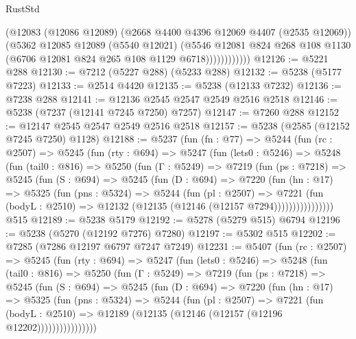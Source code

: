 \begin{lexlean}{RustStd}
\begin{coremodule}
                    (@12083
                      (@12086 @12089)
                      (@2668 @4400 @4396 @12069 @4407 (@2535 @12069))
                      (@5362
                        @12085
                        @12089
                        (@5540 @12021)
                        (@5546
                          @12081
                          @824
                          @268
                          @108
                          @1130
                          (@6706 @12081 @824 @265 @108 @1129 @6718))))))))))))
@12126 := @5221 @288
@12130 := @7212 (@5227 @288) (@5233 @288)
@12132 := @5238 (@5177 @7223)
@12133 := @2514 @4420
@12135 := @5238 (@12133 @7232)
@12136 := @7238 @288
@12141 := @12136 @2545 @2547 @2549 @2516 @2518
@12146 := @5238 (@7237 (@12141 @7245 @7250) @7257)
@12147 := @7260 @288
@12152 := @12147 @2545 @2547 @2549 @2516 @2518
@12157 := @5238 (@2585 (@12152 @7245 @7250) @1128)
@12188 := @5237
    (fun (fn : @77) =>
    @5244
      (fun (rc : @2507) =>
      @5245
        (fun (rty : @694) =>
        @5247
          (fun (lets0 : @5246) =>
          @5248
            (fun (tail0 : @816) =>
            @5250
              (fun (Γ : @5249) =>
              @7219
                (fun (ps : @7218) =>
                @5245
                  (fun (S : @694) =>
                  @5245
                    (fun (D : @694) =>
                    @7220
                      (fun (hn : @17) =>
                      @5325
                        (fun (pns : @5324) =>
                        @5244
                          (fun (pl : @2507) =>
                          @7221
                            (fun (bodyL : @2510) =>
                            @12132 (@12135 (@12146 (@12157 @7294))))))))))))))))
    @515
@12189 := @5238 @5179
@12192 := @5278 (@5279 @515) @6794
@12196 := @5238 (@5270 (@12192 @7276) @7280)
@12197 := @5302 @515
@12202 := @7285 (@7286 @12197 @6797 @7247 @7249)
@12231 := @5407
    (fun (rc : @2507) =>
    @5245
      (fun (rty : @694) =>
      @5247
        (fun (lets0 : @5246) =>
        @5248
          (fun (tail0 : @816) =>
          @5250
            (fun (Γ : @5249) =>
            @7219
              (fun (ps : @7218) =>
              @5245
                (fun (S : @694) =>
                @5245
                  (fun (D : @694) =>
                  @7220
                    (fun (hn : @17) =>
                    @5325
                      (fun (pns : @5324) =>
                      @5244
                        (fun (pl : @2507) =>
                        @7221
                          (fun (bodyL : @2510) =>
                          @12189 (@12135 (@12146 (@12157 (@12196 @12202))))))))))))))))

\end{coremodule}
\end{lexlean}
